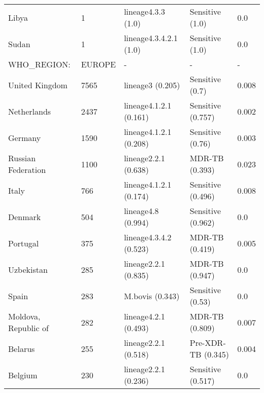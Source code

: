 \begin{tabular}{lllll}
 Libya                                        & 1                     & lineage4.3.3 (1.0)       & Sensitive (1.0)     & 0.0        \\
 Sudan                                        & 1                     & lineage4.3.4.2.1 (1.0)   & Sensitive (1.0)     & 0.0        \\
 WHO\_REGION:                                  & EUROPE                & -                        & -                   & -          \\
 United Kingdom                               & 7565                  & lineage3 (0.205)         & Sensitive (0.7)     & 0.008      \\
 Netherlands                                  & 2437                  & lineage4.1.2.1 (0.161)   & Sensitive (0.757)   & 0.002      \\
 Germany                                      & 1590                  & lineage4.1.2.1 (0.208)   & Sensitive (0.76)    & 0.003      \\
 Russian Federation                           & 1100                  & lineage2.2.1 (0.638)     & MDR-TB (0.393)      & 0.023      \\
 Italy                                        & 766                   & lineage4.1.2.1 (0.174)   & Sensitive (0.496)   & 0.008      \\
 Denmark                                      & 504                   & lineage4.8 (0.994)       & Sensitive (0.962)   & 0.0        \\
 Portugal                                     & 375                   & lineage4.3.4.2 (0.523)   & MDR-TB (0.419)      & 0.005      \\
 Uzbekistan                                   & 285                   & lineage2.2.1 (0.835)     & MDR-TB (0.947)      & 0.0        \\
 Spain                                        & 283                   & M.bovis (0.343)          & Sensitive (0.53)    & 0.0        \\
 Moldova, Republic of                         & 282                   & lineage4.2.1 (0.493)     & MDR-TB (0.809)      & 0.007      \\
 Belarus                                      & 255                   & lineage2.2.1 (0.518)     & Pre-XDR-TB (0.345)  & 0.004      \\
 Belgium                                      & 230                   & lineage2.2.1 (0.236)     & Sensitive (0.517)   & 0.0        \\

\end{tabular}
